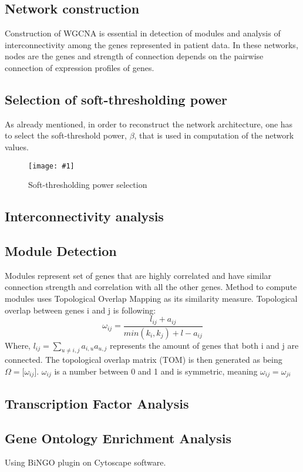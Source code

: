 \documentclass{ba-kecs}
\numberwithin{figure}{section}
\numberwithin{equation}{section}
\newcommand{\dkepic}[2]{ %
	\begin{figure}[H] %
	\texttt{[image: \#1]}
	\caption{#2}
	\label{#1}
	\end{figure}
}
\begin{document}
\subsection{Network construction}
Construction of WGCNA is essential in detection of modules and analysis of interconnectivity among the genes represented in patient data. In these networks, nodes are the genes and strength of connection depends on the pairwise connection of expression profiles of genes.
\subsection{Selection of soft-thresholding power}
As already mentioned, in order to reconstruct the network architecture, one has to select the soft-threshold power, $\beta$, that is used in computation of the network values\cite{wgcna3}.
\dkepic{power}{Soft-thresholding power selection}
\subsection{Interconnectivity analysis}


\subsection{Module Detection}
Modules represent set of genes that are highly correlated and have similar connection strength and correlation with all the other genes. Method to compute modules uses Topological Overlap Mapping as its similarity measure. Topological overlap between genes i and j is following:\\
\begin{equation}
\omega _{ij} = \dfrac{l _{ij} + a_{ij}}{min(k_i,k_j) + l - a_{ij}}
\end{equation}
Where, $l_{ij} = \sum_{u \neq {i,j}} a_{i,u} a_{u,j}$ represents the amount of genes that both i and j are connected. The topological overlap matrix (TOM) is then generated as being $\Omega = \lbrack \omega _{ij} \rbrack$. $\omega _{ij}$ is a number between 0 and 1 and is symmetric, meaning $\omega _{ij} = \omega _{ji}$
\subsection{Transcription Factor Analysis}

\subsection{Gene Ontology Enrichment Analysis}
Using BiNGO plugin on Cytoscape software.
\end{document}
